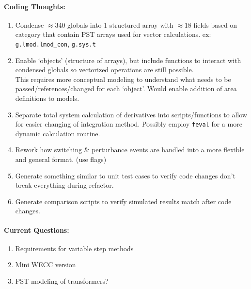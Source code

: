 \documentclass[12pt]{article}
\begin{document}
\begin{multicols}{2}
\paragraph{Coding Thoughts:} 
	\begin{enumerate}

		\itemsep 0em 
		\item Condense $\approx$340 globals into 1 structured array with $\approx$18 fields based on category that contain PST arrays used for vector calculations. ex: \verb|g.lmod.lmod_con|, \verb|g.sys.t|
		\item Enable `objects' (structure of arrays), but include functions to interact with condensed globals so vectorized operations are still possible.\\
		This requires more conceptual modeling to understand what needs to be passed/references/changed for each `object'.
		Would enable addition of area definitions to models.
		\item Separate total system calculation of derivatives into scripts/functions to allow for easier changing of integration method.
		Possibly employ \verb|feval| for a more dynamic calculation routine.
		\item Rework how switching \& perturbance events are handled into a more flexible and general format. (use flags)
		\item Generate something similar to unit test cases to verify code changes don't break everything during refactor.
		\item Generate comparison scripts to verify simulated results match after code changes.
	\end{enumerate}
	


\paragraph{Current Questions:}
	\begin{enumerate}
	\itemsep0em 
	\item Requirements for variable step methods
	\item Mini WECC version
	\item PST modeling of transformers?
	\end{enumerate}



\vfill\null
\end{multicols}
\end{document}
